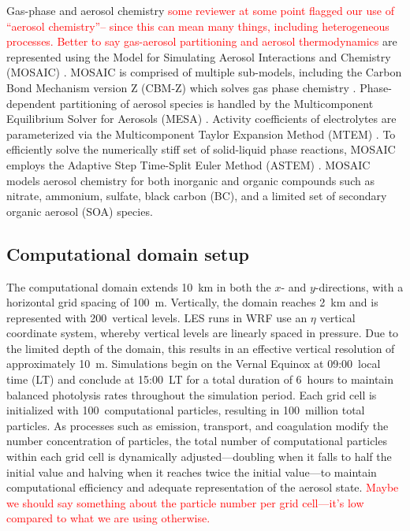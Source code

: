 \documentclass[journal abbreviation, manuscript]{copernicus}
\begin{document}
Gas-phase and aerosol chemistry \textcolor{red}{some reviewer at some
  point flagged our use of ``aerosol chemistry''-- since this can mean
  many things, including heterogeneous processes. Better to say
  gas-aerosol partitioning and aerosol thermodynamics} are represented
using the Model for Simulating Aerosol Interactions and Chemistry
(MOSAIC) \citep{zaveri_model_2008}. MOSAIC is comprised of multiple
sub-models, including the Carbon Bond Mechanism version Z (CBM-Z)
which solves gas phase chemistry
\citep{zaveri_new_1999}. Phase-dependent partitioning of aerosol
species is handled by the Multicomponent Equilibrium Solver for
Aerosols (MESA) \citep{zaveri_computationally_2005}. Activity
coefficients of electrolytes are parameterized via the Multicomponent
Taylor Expansion Method (MTEM) \citep{zaveri_new_2005}. To efficiently
solve the numerically stiff set of solid-liquid phase reactions,
MOSAIC employs the Adaptive Step Time-Split Euler Method (ASTEM)
\citep{zaveri_model_2008}. MOSAIC models aerosol chemistry for both
inorganic and organic compounds such as nitrate, ammonium, sulfate,
black carbon (BC), and a limited set of secondary organic aerosol
(SOA) species.

\subsection{Computational domain setup}

The computational domain extends 10~km in both the $x$- and
$y$-directions, with a horizontal grid spacing of 100~m.  Vertically,
the domain reaches 2~km and is represented with 200~vertical
levels. LES runs in WRF use an $\eta$ vertical coordinate system,
whereby vertical levels are linearly spaced in pressure. Due to the
limited depth of the domain, this results in an effective vertical
resolution of approximately 10~m. Simulations begin on the Vernal
Equinox at 09:00~local time (LT) and conclude at 15:00~LT for a total
duration of 6~hours to maintain balanced photolysis rates throughout
the simulation period. Each grid cell is initialized with
100~computational particles, resulting in 100~million total
particles. As processes such as emission, transport, and coagulation
modify the number concentration of particles, the total number of
computational particles within each grid cell is dynamically
adjusted---doubling when it falls to half the initial value and
halving when it reaches twice the initial value---to maintain
computational efficiency and adequate representation of the aerosol
state. \textcolor{red}{Maybe we should say something about the
  particle number per grid cell---it's low compared to what we are
  using otherwise.}
\end{document}
